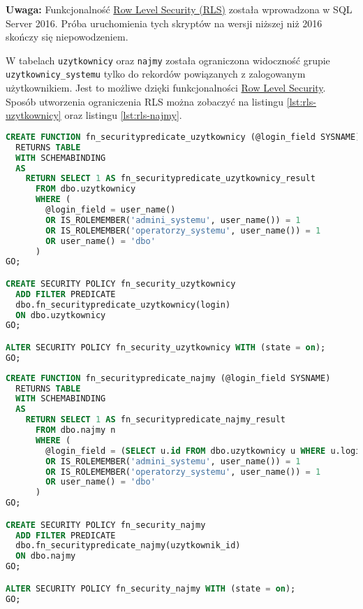 \textbf{Uwaga:} Funkcjonalność \href{https://docs.microsoft.com/en-us/sql/relational-databases/security/row-level-security?view=sql-server-2017}{Row Level Security (RLS)} została wprowadzona w SQL Server 2016. Próba uruchomienia tych skryptów na wersji niższej niż 2016 skończy się niepowodzeniem.

W tabelach \texttt{uzytkownicy} oraz \texttt{najmy} została ograniczona widoczność grupie \texttt{uzytkownicy\_systemu} tylko do rekordów powiązanych z zalogowanym użytkownikiem. Jest to możliwe dzięki funkcjonalności \href{https://docs.microsoft.com/en-us/sql/relational-databases/security/row-level-security?view=sql-server-2017}{Row Level Security}. Sposób utworzenia ograniczenia RLS można zobaczyć na listingu \ref{lst:rls-uzytkownicy} oraz listingu \ref{lst:rls-najmy}.

\begin{lstlisting}[language=SQL, caption={Skrypt ustawiający ograniczenie RLS na tabeli \texttt{uzytkownicy}}, label={lst:rls-uzytkownicy}]
CREATE FUNCTION fn_securitypredicate_uzytkownicy (@login_field SYSNAME)
  RETURNS TABLE
  WITH SCHEMABINDING
  AS
    RETURN SELECT 1 AS fn_securitypredicate_uzytkownicy_result
      FROM dbo.uzytkownicy
      WHERE (
        @login_field = user_name()
        OR IS_ROLEMEMBER('admini_systemu', user_name()) = 1
        OR IS_ROLEMEMBER('operatorzy_systemu', user_name()) = 1
        OR user_name() = 'dbo'
      )
GO;

CREATE SECURITY POLICY fn_security_uzytkownicy
  ADD FILTER PREDICATE
  dbo.fn_securitypredicate_uzytkownicy(login)
  ON dbo.uzytkownicy
GO;

ALTER SECURITY POLICY fn_security_uzytkownicy WITH (state = on);
GO;
\end{lstlisting}

\begin{lstlisting}[language=SQL, caption={Skrypt ustawiający ograniczenie RLS na tabeli \texttt{najmy}}, label={lst:rls-najmy}]
CREATE FUNCTION fn_securitypredicate_najmy (@login_field SYSNAME)
  RETURNS TABLE
  WITH SCHEMABINDING
  AS
    RETURN SELECT 1 AS fn_securitypredicate_najmy_result
      FROM dbo.najmy n
      WHERE (
        @login_field = (SELECT u.id FROM dbo.uzytkownicy u WHERE u.login COLLATE SQL_Latin1_General_CP1_CS_AS = CURRENT_USER COLLATE SQL_Latin1_General_CP1_CS_AS)
        OR IS_ROLEMEMBER('admini_systemu', user_name()) = 1
        OR IS_ROLEMEMBER('operatorzy_systemu', user_name()) = 1
        OR user_name() = 'dbo'
      )
GO;

CREATE SECURITY POLICY fn_security_najmy
  ADD FILTER PREDICATE
  dbo.fn_securitypredicate_najmy(uzytkownik_id)
  ON dbo.najmy
GO;

ALTER SECURITY POLICY fn_security_najmy WITH (state = on);
GO;
\end{lstlisting}

